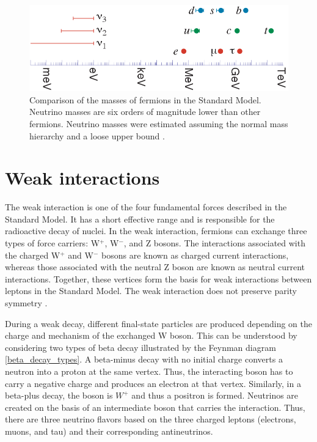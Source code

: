 \vspace{0.3cm}
\begin{figure}[!htb]
\centering
\includegraphics[width=0.85\linewidth]{ch1/figs/n_mass_comp.png}
\vspace{0.3cm}
\caption{Comparison of the masses of fermions in the Standard Model. Neutrino masses are six orders of magnitude lower than other fermions. Neutrino masses were estimated assuming the normal mass hierarchy and a loose upper bound \cite{Hewett:2012ns}.}
\label{n_mass_comp}
\end{figure}

\section{Weak interactions}
The weak interaction is one of the four fundamental forces described in the Standard Model. It has a short effective range and is responsible for the radioactive decay of nuclei. In the weak interaction, fermions can exchange three types of force carriers: W$^+$, W$^-$, and Z bosons. The interactions associated with the charged W$^+$ and W$^-$ bosons are known as charged current interactions, whereas those associated with the neutral Z boson are known as neutral current interactions. Together, these vertices form the basis for weak interactions between leptons in the Standard Model. The weak interaction does not preserve parity symmetry \cite{wu_experiment}.

During a weak decay, different final-state particles are produced depending on the charge and mechanism of the exchanged W boson. This can be understood by considering two types of beta decay illustrated by the Feynman diagram \ref{beta_decay_types}. A beta-minus decay with no initial charge converts a neutron into a proton at the same vertex. Thus, the interacting boson has to carry a negative charge and produces an electron at that vertex. Similarly, in a beta-plus decay, the boson is $W^+$ and thus a positron is formed. Neutrinos are created on the basis of an intermediate boson that carries the interaction. Thus, there are three neutrino flavors based on the three charged leptons (electrons, muons, and tau) and their corresponding antineutrinos. 

